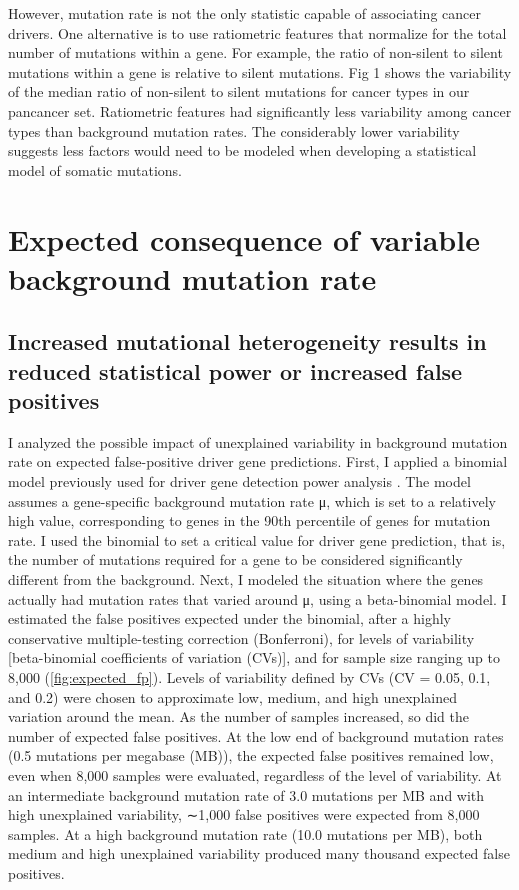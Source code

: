 However, mutation rate is not the only statistic capable of associating cancer drivers. One alternative is to use ratiometric features that normalize for the total number of mutations within a gene. For example, the ratio of non-silent to silent mutations within a gene is relative to silent mutations. Fig 1 shows the variability of the median ratio of non-silent to silent mutations for cancer types in our pancancer set. Ratiometric features had significantly less variability among cancer types than background mutation rates. The considerably lower variability suggests less factors would need to be modeled when developing a statistical model of somatic mutations.

\section{Expected consequence of variable background mutation rate}

\subsection{Increased mutational heterogeneity results in reduced statistical power or increased false positives}

I analyzed the possible impact of unexplained variability in background mutation rate on expected false-positive driver gene predictions. First, I applied a binomial model previously used for driver gene detection power analysis \cite{RN14}. The model assumes a gene-specific background mutation rate μ, which is set to a relatively high value, corresponding to genes in the 90th percentile of genes for mutation rate. I used the binomial to set a critical value for driver gene prediction, that is, the number of mutations required for a gene to be considered significantly different from the background. Next, I modeled the situation where the genes actually had mutation rates that varied around μ, using a beta-binomial model. I estimated the false positives expected under the binomial, after a highly conservative multiple-testing correction (Bonferroni), for levels of variability [beta-binomial coefficients of variation (CVs)], and for sample size ranging up to 8,000 (\autoref{fig:expected_fp}). Levels of variability defined by CVs (CV = 0.05, 0.1, and 0.2) were chosen to approximate low, medium, and high unexplained variation around the mean. As the number of samples increased, so did the number of expected false positives. At the low end of background mutation rates (0.5 mutations per megabase (MB)), the expected false positives remained low, even when 8,000 samples were evaluated, regardless of the level of variability. At an intermediate background mutation rate of 3.0 mutations per MB and with high unexplained variability, ∼1,000 false positives were expected from 8,000 samples. At a high background mutation rate (10.0 mutations per MB), both medium and high unexplained variability produced many thousand expected false positives.

